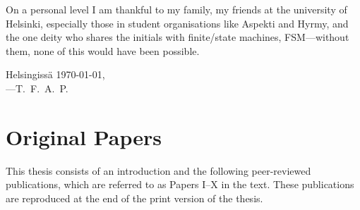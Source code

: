 \documentclass[officiallayout]{unihelcompling}
\begin{document}
On a personal level I am thankful to my family, my friends at the university of
Helsinki, especially those in student organisations like Aspekti and Hyrmy, and
the one deity who shares the initials with finite\-/state machines,
FSM---without them, none of this would have been possible.

\textfinnish{Helsingissä \today,\\
---T.~F.~A.~P.}

\chapter*{Original Papers}
\label{chap:papers}

This thesis consists of an introduction and the following peer-reviewed
publications, which are referred to as Papers I–X in the text. These
publications are reproduced at the end of the print version of the thesis.

\end{document}
